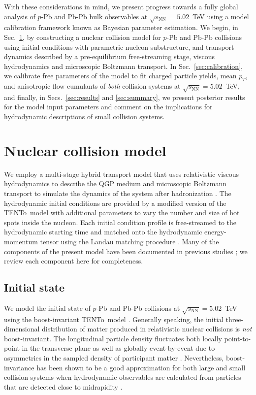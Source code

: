 \documentclass[aps,prc,reprint,amsmath,nofootinbib]{revtex4-1}
\newcommand{\trento}{T\raisebox{-0.5ex}{R}ENTo}
\newcommand{\sqrts}{\sqrt{s_\mathrm{NN}}}
\begin{document}
With these considerations in mind, we present progress towards a fully global analysis of $p$-Pb and Pb-Pb bulk observables at $\sqrts=5.02$~TeV using a model calibration framework known as Bayesian parameter estimation.
We begin, in Sec.~\ref{sec:model}, by constructing a nuclear collision model for $p$-Pb and Pb-Pb collisions using initial conditions with parametric nucleon substructure, and transport dynamics described by a pre-equilibrium free-streaming stage, viscous hydrodynamics and microscopic Boltzmann transport.
In Sec.~\ref{sec:calibration}, we calibrate free parameters of the model to fit charged particle yields, mean $p_T$, and anisotropic flow cumulants of \emph{both} collision systems at $\sqrts=5.02$~TeV, and finally, in Secs.~\ref{sec:results} and \ref{sec:summary}, we present posterior results for the model input parameters and comment on the implications for hydrodynamic descriptions of small collision systems.


\section{Nuclear collision model}
\label{sec:model}

We employ a multi-stage hybrid transport model that uses relativistic viscous hydrodynamics to describe the QGP medium and microscopic Boltzmann transport to simulate the dynamics of the system after hadronization \cite{Shen:2014vra, Bernhard:2016tnd}.
The hydrodynamic initial conditions are provided by a modified version of the \trento\ model \cite{Moreland:2014oya} with additional parameters to vary the number and size of hot spots inside the nucleon.
Each initial condition profile is free-streamed to the hydrodynamic starting time and matched onto the hydrodynamic energy-momentum tensor using the Landau matching procedure \cite{Broniowski:2008qk, Heinz:2015arc}.
Many of the components of the present model have been documented in previous studies \cite{Moreland:2014oya, Bernhard:2016tnd, Bernhard:2018hnz}; we review each component here for completeness.

\subsection{Initial state}
\label{sec:initial_state}

We model the initial state of $p$-Pb and Pb-Pb collisions at $\sqrts=5.02$~TeV using the boost-invariant \trento\ model \cite{Moreland:2014oya}.
Generally speaking, the initial three-dimensional distribution of matter produced in relativistic nuclear collisions is \emph{not} boost-invariant.
The longitudinal particle density fluctuates both locally point-to-point in the transverse plane as well as globally event-by-event due to asymmetries in the sampled density of participant matter \cite{Ke:2016jrd, Bozek:2010vz}.
Nevertheless, boost-invariance has been shown to be a good approximation for both large and small collision systems when hydrodynamic observables are calculated from particles that are detected close to midrapidity \cite{Shen:2016zpp}.
\end{document}
